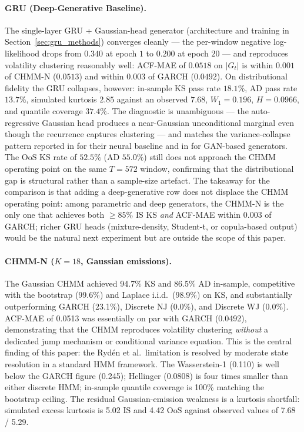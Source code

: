 \paragraph{GRU (Deep-Generative Baseline).}
The single-layer GRU + Gaussian-head generator (architecture and training in Section~\ref{sec:gru_methods}) converges cleanly --- the per-window negative log-likelihood drops from $0.340$ at epoch $1$ to $0.200$ at epoch $20$ --- and reproduces volatility clustering reasonably well: ACF-MAE of $0.0518$ on $|G_t|$ is within $0.001$ of CHMM-N ($0.0513$) and within $0.003$ of GARCH ($0.0492$).
On distributional fidelity the GRU collapses, however: in-sample KS pass rate $18.1\%$, AD pass rate $13.7\%$, simulated kurtosis $2.85$ against an observed $7.68$, $W_1 = 0.196$, $H = 0.0966$, and quantile coverage $37.4\%$.
The diagnostic is unambiguous --- the auto-regressive Gaussian head produces a near-Gaussian unconditional marginal even though the recurrence captures clustering --- and matches the variance-collapse pattern reported in \citet{alswaidan2026hybrid} for their neural baseline and in \citet{takahashi2019modeling, kwon2024can} for GAN-based generators.
The OoS KS rate of $52.5\%$ (AD $55.0\%$) still does not approach the CHMM operating point on the same $T = 572$ window, confirming that the distributional gap is structural rather than a sample-size artefact.
The takeaway for the comparison is that adding a deep-generative row does not displace the CHMM operating point: among parametric and deep generators, the CHMM-N is the only one that achieves both $\geq 85\%$ IS KS \emph{and} ACF-MAE within $0.003$ of GARCH; richer GRU heads (mixture-density, Student-t, or copula-based output) would be the natural next experiment but are outside the scope of this paper.

\paragraph{CHMM-N ($K = 18$, Gaussian emissions).}
The Gaussian CHMM achieved 94.7\% KS and 86.5\% AD in-sample, competitive with the bootstrap (99.6\%) and Laplace i.i.d.\ (98.9\%) on KS, and substantially outperforming GARCH (23.1\%), Discrete NJ (0.0\%), and Discrete WJ (0.0\%).
ACF-MAE of 0.0513 was essentially on par with GARCH (0.0492), demonstrating that the CHMM reproduces volatility clustering \emph{without} a dedicated jump mechanism or conditional variance equation.
This is the central finding of this paper: the Ryd\'{e}n et al.\ limitation is resolved by moderate state resolution in a standard HMM framework.
The Wasserstein-1 (0.110) is well below the GARCH figure (0.245); Hellinger (0.0808) is four times smaller than either discrete HMM; in-sample quantile coverage is 100\% matching the bootstrap ceiling.
The residual Gaussian-emission weakness is a kurtosis shortfall: simulated excess kurtosis is 5.02 IS and 4.42 OoS against observed values of 7.68 / 5.29.

